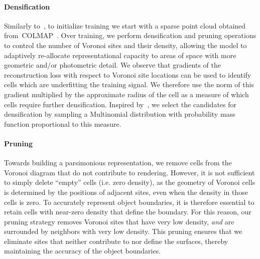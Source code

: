 \paragraph{Densification}
Similarly to~\citet{gsplat}, to initialize training we start with a sparse point cloud obtained from~COLMAP~\cite{sfm}.
Over training, we perform densification and pruning operations to control the number of Voronoi sites and their density, allowing the model to adaptively re-allocate representational capacity to areas of space with more geometric and/or photometric detail.
\quad
We observe that gradients of the reconstruction loss with respect to Voronoi site locations can be used to identify cells which are underfitting the training signal.
We therefore use the norm of this gradient multiplied by the approximate radius of the cell as a measure of which cells require further densification.
Inspired by~\citet{3dgs-mcmc}, we select the candidates for densification by sampling a Multinomial distribution with probability mass function proportional to this measure.

\paragraph{Pruning}
Towards building a parsimonious representation, we remove cells from the Voronoi diagram that do not contribute to rendering.
However, it is not sufficient to simply delete ``empty'' cells (i.e. zero density), as the geometry of Voronoi cells is determined by the positions of adjacent sites, even when the density in those cells is zero.
To accurately represent object boundaries, it is therefore essential to retain cells with near-zero density that define the boundary. 
For this reason, our pruning strategy removes Voronoi sites that have very low density, \textit{and} are surrounded by neighbors with very low density.
This pruning ensures that we eliminate sites that neither contribute to nor define the surfaces, thereby maintaining the accuracy of the object boundaries.

